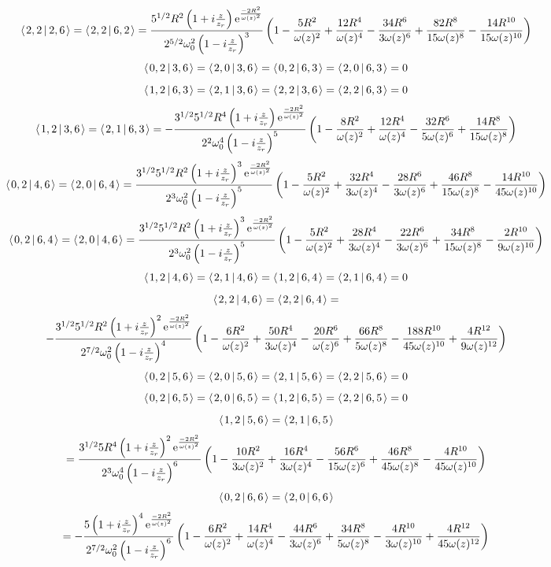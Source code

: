 \documentclass[11pt]{amsart}
\makeatletter
\newcommand{\e}{{\rm e}}				%
\newcommand{\msp}[1]{\mspace{#1mu}}		%
\newcommand{\0}{\varnothing}		%
\newcommand{\brac}[2]{\left\langle\msp{2} #1\left\lvert \msp{3.5} #2 \right.\right\rangle}	%
\newcommand{\1}{!}
\newcommand{\2}{@}
\newcommand{\3}{\#}
\newcommand{\4}{\$}
\newcommand{\5}{\%}
\newcommand{\6}{$^\wedge$}
\newcommand{\7}{\&}
\newcommand{\8}{*}
\newcommand{\9}{(}
\makeatother
\begin{document}
\[
\brac{2,2}{2,6} = \brac{2,2}{6,2} = \frac{5^{1/2}R^2\left(1+i\frac{z}{z_r}\right)\e^{\frac{-2R^2}{\omega(z)^2}}}{2^{5/2}\omega_0^2\left(1-i\frac{z}{z_r}\right)^3}\left(1-\frac{5R^2}{\omega(z)^2}+\frac{12R^4}{\omega(z)^4}-\frac{34R^6}{3\omega(z)^6}+\frac{82R^8}{15\omega(z)^8}-\frac{14R^{10}}{15\omega(z)^{10}}\right)
\]
\[
\brac{0,2}{3,6} = \brac{2,0}{3,6} = \brac{0,2}{6,3} = \brac{2,0}{6,3} = 0
\]
\[
\brac{1,2}{6,3} = \brac{2,1}{3,6} = \brac{2,2}{3,6} = \brac{2,2}{6,3} = 0
\]
\[
\brac{1,2}{3,6} = \brac{2,1}{6,3} = -\frac{3^{1/2}5^{1/2}R^4\left(1+i\frac{z}{z_r}\right)\e^{\frac{-2R^2}{\omega(z)^2}}}{2^2\omega_0^4\left(1-i\frac{z}{z_r}\right)^5}\left(1-\frac{8R^2}{\omega(z)^2}+\frac{12R^4}{\omega(z)^4}-\frac{32R^6}{5\omega(z)^6}+\frac{14R^8}{15\omega(z)^8}\right)
\]
\[
\brac{0,2}{4,6} = \brac{2,0}{6,4} = \frac{3^{1/2}5^{1/2}R^2\left(1+i\frac{z}{z_r}\right)^3\e^{\frac{-2R^2}{\omega(z)^2}}}{2^3\omega_0^2\left(1-i\frac{z}{z_r}\right)^5}\left(1-\frac{5R^2}{\omega(z)^2}+\frac{32R^4}{3\omega(z)^4}-\frac{28R^6}{3\omega(z)^6}+\frac{46R^8}{15\omega(z)^8}-\frac{14R^{10}}{45\omega(z)^{10}}\right)
\]
\[
\brac{0,2}{6,4} = \brac{2,0}{4,6} = \frac{3^{1/2}5^{1/2}R^2\left(1+i\frac{z}{z_r}\right)^3\e^{\frac{-2R^2}{\omega(z)^2}}}{2^3\omega_0^2\left(1-i\frac{z}{z_r}\right)^5}\left(1-\frac{5R^2}{\omega(z)^2}+\frac{28R^4}{3\omega(z)^4}-\frac{22R^6}{3\omega(z)^6}+\frac{34R^8}{15\omega(z)^8}-\frac{2R^{10}}{9\omega(z)^{10}}\right)
\]
\[
\brac{1,2}{4,6} = \brac{2,1}{4,6}=\brac{1,2}{6,4} = \brac{2,1}{6,4} = 0
\]\newpage
\[
\brac{2,2}{4,6} = \brac{2,2}{6,4}=
\]
\[
 -\frac{3^{1/2}5^{1/2}R^2\left(1+i\frac{z}{z_r}\right)^2\e^{\frac{-2R^2}{\omega(z)^2}}}{2^{7/2}\omega_0^2\left(1-i\frac{z}{z_r}\right)^4}\left(1-\frac{6R^2}{\omega(z)^2}+\frac{50R^4}{3\omega(z)^4}-\frac{20R^6}{\omega(z)^6}+\frac{66R^8}{5\omega(z)^8}-\frac{188R^{10}}{45\omega(z)^{10}}+\frac{4R^{12}}{9\omega(z)^{12}}\right)
\]
\[
\brac{0,2}{5,6}=\brac{2,0}{5,6} = \brac{2,1}{5,6}=\brac{2,2}{5,6} = 0
\]
\[
\brac{0,2}{6,5} = \brac{2,0}{6,5} = \brac{1,2}{6,5} = \brac{2,2}{6,5} = 0
\]
\[
\brac{1,2}{5,6} = \brac{2,1}{6,5}\]
\[ = \frac{3^{1/2}5R^4\left(1+i\frac{z}{z_r}\right)^2\e^{\frac{-2R^2}{\omega(z)^2}}}{2^3\omega_0^4\left(1-i\frac{z}{z_r}\right)^6}\left(1-\frac{10R^2}{3\omega(z)^2}+\frac{16R^4}{3\omega(z)^4}-\frac{56R^6}{15\omega(z)^6}+\frac{46R^8}{45\omega(z)^8}-\frac{4R^{10}}{45\omega(z)^{10}}\right)
\]
\[
\brac{0,2}{6,6}=\brac{2,0}{6,6}
\]
\[
=-\frac{5\left(1+i\frac{z}{z_r}\right)^4\e^{\frac{-2R^2}{\omega(z)^2}}}{2^{7/2}\omega_0^2\left(1-i\frac{z}{z_r}\right)^6}\left(1-\frac{6R^2}{\omega(z)^2}+\frac{14R^4}{\omega(z)^4}-\frac{44R^6}{3\omega(z)^6}+\frac{34R^8}{5\omega(z)^8}-\frac{4R^{10}}{3\omega(z)^{10}}+\frac{4R^{12}}{45\omega(z)^{12}}\right)
\]
\end{document}

